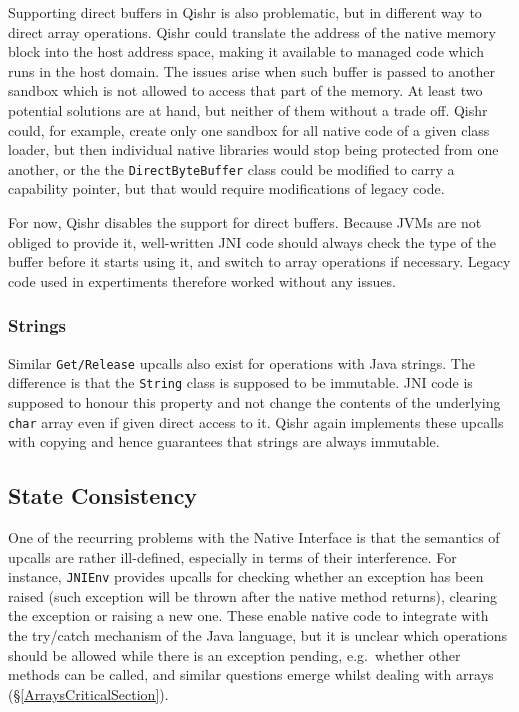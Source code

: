 \documentclass[a4paper,12pt,twoside,openright]{report}
\newcommand{\class}[1]{\texttt{#1}}
\begin{document}
Supporting direct buffers in Qishr is also problematic, but in different way to direct array operations. Qishr could translate the address of the native memory block into the host address space, making it available to managed code which runs in the host domain. The issues arise when such buffer is passed to another sandbox which is not allowed to access that part of the memory. At least two potential solutions are at hand, but neither of them without a trade off. Qishr could, for example, create only one sandbox for all native code of a given class loader, but then individual native libraries would stop being protected from one another, or the the \class{DirectByteBuffer} class could be modified to carry a capability pointer, but that would require modifications of legacy code.

For now, Qishr disables the support for direct buffers. Because JVMs are not obliged to provide it, well-written JNI code should always check the type of the buffer before it starts using it, and switch to array operations if necessary. Legacy code used in expertiments therefore worked without any issues.

\subsubsection{Strings}

Similar \texttt{Get/Release} upcalls also exist for operations with Java strings. The difference is that the \class{String} class is supposed to be immutable. JNI code is supposed to honour this property and not change the contents of the underlying \class{char} array even if given direct access to it. Qishr again implements these upcalls with copying and hence guarantees that strings are always immutable.

\subsection{State Consistency}

One of the recurring problems with the Native Interface is that the semantics of upcalls are rather ill-defined, especially in terms of their interference. For instance, \texttt{JNIEnv} provides upcalls for checking whether an exception has been raised (such exception will be thrown after the native method returns), clearing the exception or raising a new one. These enable native code to integrate with the try/catch mechanism of the Java language, but it is unclear which operations should be allowed while there is an exception pending, e.g.\ whether other methods can be called, and similar questions emerge whilst dealing with arrays (\S\ref{ArraysCriticalSection}). 
\end{document}
